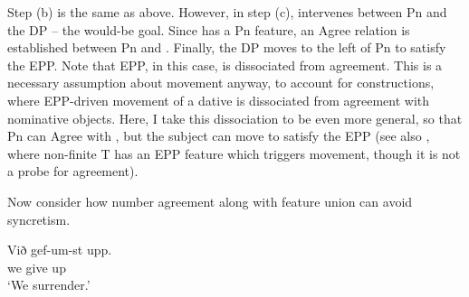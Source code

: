 \documentclass[output=paper]{langscibook}
\def\exattr#1{\hfill{} #1}
\begin{document}
Step (b) is the same as above. 
However, in step (c), \stin{} intervenes between Pn and the DP -- the would-be goal. Since \stin{} has a Pn feature, an Agree relation is established between Pn and \stin{}. 
Finally, the DP moves to the left of Pn to satisfy the EPP. Note that EPP, in this case, is dissociated from agreement. This is a necessary assumption about movement anyway, to account for \datnom constructions, where EPP-driven movement of a dative is dissociated from agreement with nominative objects.
Here, I take this dissociation to be even more general, so that Pn can Agree with \stin, but the subject can move to satisfy the EPP (see also \citet[118]{baker2010agreement}, where non-finite T has an EPP feature which triggers movement, though it is not a probe for agreement).

Now consider how number agreement along with feature union can avoid syncretism.

\ea
{\gll Við gef-um-st upp.  \\
we\nom{} give up \\
\glt `We surrender.'}
\exattr{\citep[3]{Kissock:1997gm}}%
\z



% 

\end{document}
